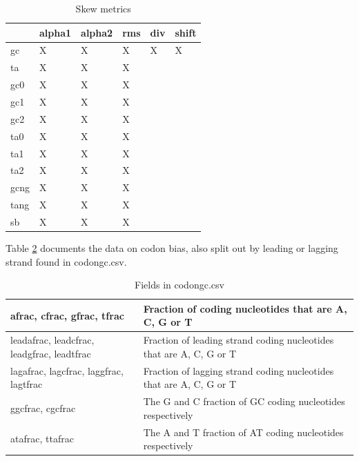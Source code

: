 \documentclass[fleqn,10pt]{wlscirep}
\begin{document}
\begin{table}[H]
  \centering
\begin{tabular}{|l|l|l|l|ll}
\hline
     & alpha1 & alpha2 & rms & \multicolumn{1}{l|}{div} & \multicolumn{1}{l|}{shift} \\ \hline
gc   & X      &  X     &  X  & \multicolumn{1}{l|}{X}   & \multicolumn{1}{l|}{X}     \\ \hline
ta   & X      &  X     &  X  &                          &                            \\ \cline{1-4}
gc0  & X      &  X     &  X  &                          &                            \\ \cline{1-4}
gc1  & X      &  X     &  X  &                          &                            \\ \cline{1-4}
gc2  & X      &  X     &  X  &                          &                            \\ \cline{1-4}
ta0  & X      &  X     &  X  &                          &                            \\ \cline{1-4}
ta1  & X      &  X     &  X  &                          &                            \\ \cline{1-4}
ta2  & X      &  X     &  X  &                          &                            \\ \cline{1-4}
gcng & X      &  X     &  X  &                          &                            \\ \cline{1-4}
tang & X      &  X     &  X  &                          &                            \\ \cline{1-4}
sb   & X      &  X     &  X  &                          &                            \\ \cline{1-4}
\end{tabular}
\caption{Skew metrics}
\label{tab:skew-table}
\end{table}

Table \ref{tab:codongc-table} documents the data on codon bias, also split out by leading or lagging strand found in codongc.csv.
\begin{table}[H]
\begin{tabular}{|l|l|}
\hline
afrac, cfrac, gfrac, tfrac                 & Fraction of coding nucleotides that are A, C, G or T                \\ \hline
leadafrac, leadcfrac, leadgfrac, leadtfrac & Fraction of leading strand coding nucleotides that are A, C, G or T \\ \hline
lagafrac, lagcfrac, laggfrac, lagtfrac     & Fraction of lagging strand coding nucleotides that are A, C, G or T \\ \hline
ggcfrac, cgcfrac                           & The G and C fraction of GC coding nucleotides respectively          \\ \hline
atafrac, ttafrac                           & The A and T fraction of AT coding nucleotides respectively          \\ \hline
\end{tabular}
\caption{Fields in codongc.csv}
\label{tab:codongc-table}
\end{table}
\end{document}
